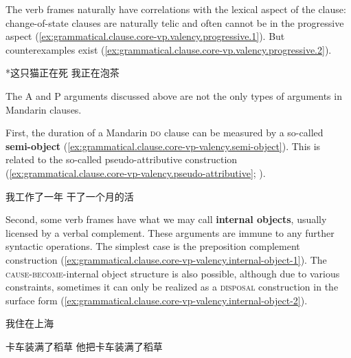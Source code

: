 \documentclass[UTF8, a4paper, oneside, scheme=plain, 12pt]{ctexrep}
\newcommand*{\concept}[1]{\textbf{#1}}
\newcommand*{\category}[1]{\textsc{#1}}
\begin{document}
The verb frames naturally have correlations with the lexical aspect of the clause:
change-of-state clauses are naturally telic and often cannot be in the progressive aspect
(\ref{ex:grammatical.clause.core-vp.valency.progressive.1}).
But counterexamples exist
(\ref{ex:grammatical.clause.core-vp.valency.progressive.2}).

\begin{exe}
    \ex\label{ex:grammatical.clause.core-vp.valency.progressive.1} *这只猫正在死
    \ex\label{ex:grammatical.clause.core-vp.valency.progressive.2} 我正在泡茶
\end{exe}

The A and P arguments discussed above are not the only types of arguments in Mandarin clauses.

First, the duration of a Mandarin \category{do} clause
can be measured by a so-called \concept{semi-object}
(\ref{ex:grammatical.clause.core-vp-valency.semi-object}).
This is related to the so-called pseudo-attributive construction
(\ref{ex:grammatical.clause.core-vp-valency.pseudo-attributive};
).

\begin{exe}
    \ex\label{ex:grammatical.clause.core-vp-valency.semi-object} 我工作了一年
    \ex\label{ex:grammatical.clause.core-vp-valency.pseudo-attributive} 干了一个月的活
\end{exe}

Second, some verb frames have what we may call \concept{internal objects}, usually licensed by a verbal complement.
These arguments are immune to any further syntactic operations.
The simplest case is the preposition complement construction (\ref{ex:grammatical.clause.core-vp-valency.internal-object-1}).
The \category{cause}-\category{become}-internal object structure is also possible,
although due to various constraints, sometimes it can only be realized as a \category{disposal} construction in the surface form (\ref{ex:grammatical.clause.core-vp-valency.internal-object-2}).


\begin{exe}
    \ex\label{ex:grammatical.clause.core-vp-valency.internal-object-1}
    我住在上海
    \ex\label{ex:grammatical.clause.core-vp-valency.internal-object-2} 
    \begin{xlist}
        \ex 卡车装满了稻草
        \ex 他把卡车装满了稻草
    \end{xlist}
\end{exe}
\end{document}
